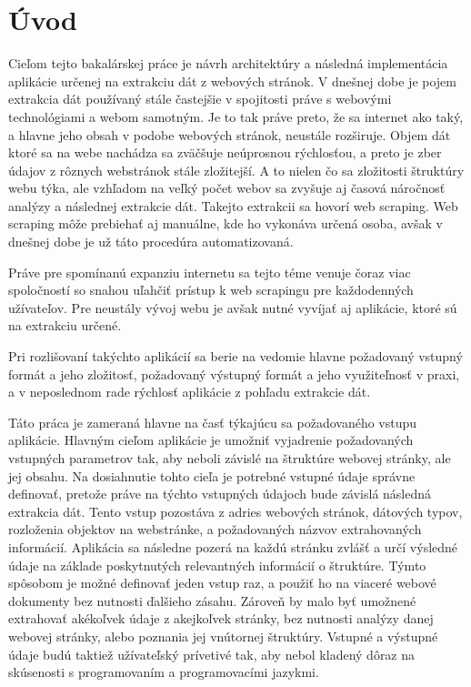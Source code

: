 \chapter{Úvod}

Cieľom tejto bakalárskej práce je návrh architektúry a následná implementácia aplikácie určenej na extrakciu dát z webových stránok. V dnešnej dobe je pojem extrakcia dát používaný stále častejšie v spojitosti práve s webovými technológiami a webom samotným. Je to tak práve preto, že sa internet ako taký, a hlavne jeho obsah v podobe webových stránok, neustále rozširuje. Objem dát ktoré sa na webe nachádza sa zväčšuje neúprosnou rýchlosťou, a preto je zber údajov z rôznych webstránok stále zložitejší. A to nielen čo sa zložitosti štruktúry webu týka, ale vzhľadom na veľký počet webov sa zvyšuje aj časová náročnosť analýzy a následnej extrakcie dát. Takejto extrakcii sa hovorí web scraping. Web scraping môže prebiehať aj manuálne, kde ho vykonáva určená osoba, avšak v dnešnej dobe je už táto procedúra automatizovaná.

Práve pre spomínanú expanziu internetu sa tejto téme venuje čoraz viac spoločností so snahou uľahčiť prístup k web scrapingu pre každodenných užívateľov. Pre neustály vývoj webu je avšak nutné vyvíjať aj aplikácie, ktoré sú na extrakciu určené. 

Pri rozlišovaní takýchto aplikácií sa berie na vedomie hlavne požadovaný vstupný formát a jeho zložitosť, požadovaný výstupný formát a jeho využiteľnosť v praxi, a v neposlednom rade rýchlosť aplikácie z pohľadu extrakcie dát. 

Táto práca je zameraná hlavne na časť týkajúcu sa požadovaného vstupu aplikácie. Hlavným cieľom aplikácie je umožniť vyjadrenie požadovaných vstupných parametrov tak, aby neboli závislé na štruktúre webovej stránky, ale jej obsahu. Na dosiahnutie tohto cieľa je potrebné vstupné údaje správne definovať, pretože práve na týchto vstupných údajoch bude závislá následná extrakcia dát. Tento vstup pozostáva z adries webových stránok, dátových typov, rozloženia objektov na webstránke, a požadovaných názvov extrahovaných informácií. Aplikácia sa následne pozerá na každú stránku zvlášť a určí výsledné údaje na základe poskytnutých relevantných informácií o štruktúre. Týmto spôsobom je možné definovať jeden vstup raz, a použiť ho na viaceré webové dokumenty bez nutnosti ďalšieho zásahu. Zároveň by malo byť umožnené extrahovať akékoľvek údaje z akejkoľvek stránky, bez nutnosti analýzy danej webovej stránky, alebo poznania jej vnútornej štruktúry. Vstupné a výstupné údaje budú taktiež užívateľský prívetivé tak, aby nebol kladený dôraz na skúsenosti s programovaním a programovacími jazykmi.


